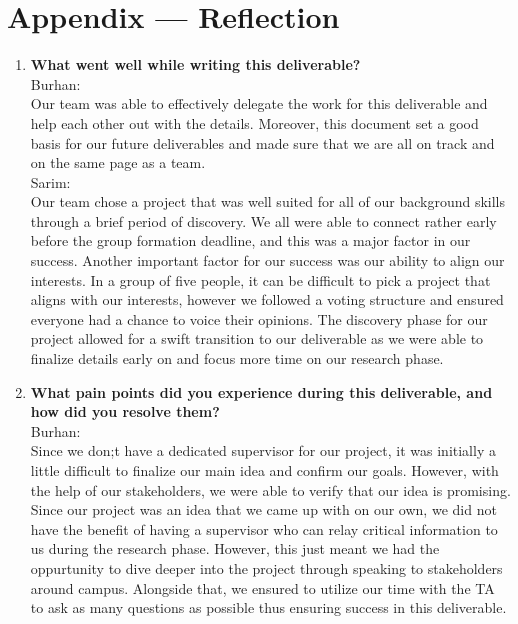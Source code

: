 \documentclass{article}
\begin{document}
\newpage{}

\section*{Appendix --- Reflection}




\begin{enumerate}
    \item {\bf What went well while writing this deliverable?} \\
    Burhan:\\
    Our team was able to effectively delegate the work for this deliverable and help each other out with the details. Moreover, this document set a good basis for our future deliverables and made sure that we are all on track and on the same page as a team. 
\\  Sarim:\\
    Our team chose a project that was well suited for all of our background skills 
    through a brief period of discovery. We all were able to connect rather early before
    the group formation deadline, and this was a major factor in our success. Another important
    factor for our success was our ability to align our interests. In a group of five people, it
    can be difficult to pick a project that aligns with our interests, however we followed a voting 
    structure and ensured everyone had a chance to voice their opinions. The discovery phase for our 
    project allowed for a swift transition to our deliverable as we were able to finalize details early 
    on and focus more time on our research phase.
    \item {\bf What pain points did you experience during this deliverable, and how
    did you resolve them?}\\
    Burhan:\\
    Since we don;t have a dedicated supervisor for our project, it was initially a little difficult to finalize our main idea and confirm our goals. However, with the help of our stakeholders, we were able to verify that our idea is promising.\\
    Since our project was an idea that we came up with on our own, we did not have the benefit of having a supervisor 
    who can relay critical information to us during the research phase. However, this just meant we had the oppurtunity
    to dive deeper into the project through speaking to stakeholders around campus. Alongside that, we ensured to utilize our time 
    with the TA to ask as many questions as possible thus ensuring success in this deliverable.

\end{enumerate}
\end{document}
